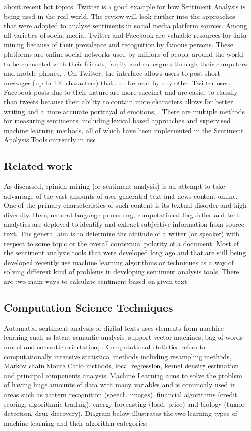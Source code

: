 about recent hot topics. Twitter is a good example for how Sentiment Analysis is being used in the
real world. The review will look further into the approaches that were adopted to analyse
sentiments in social media platform sources. Among all varieties of social media, Twitter and Facebook are valuable resources for data mining
because of their prevalence and recognition by famous persons. These platforms are online social
networks used by millions of people around the world to be connected with their friends, family
and colleagues through their computers and mobile phones, \cite{ref24}.
On Twitter, the interface allows users to post short messages (up to 140 characters) that can
be read by any other Twitter user. Facebook posts due to their nature are more succinct and are
easier to classify than tweets because their ability to contain more characters allows for better
writing and a more accurate portrayal of emotions, \cite{ref25}. There are multiple methods
for measuring sentiments, including lexical based approaches and supervised machine learning
methods, all of which have been implemented in the Sentiment Analysis Tools currently in use

\clearpage
\subsection{Related work}
As discussed, opinion mining (or sentiment analysis) is an attempt to take advantage of the vast
amounts of user-generated text and news content online. One of the primary characteristics of such
content is its textual disorder and high diversity. Here, natural language processing, computational
linguistics and text analytics are deployed to identify and extract subjective information from
source text. The general aim is to determine the attitude of a writer (or speaker) with respect to
some topic or the overall contextual polarity of a document.
Most of the sentiment analysis tools that were developed long ago and that are still being developed
recently use machine learning algorithms or techniques as a way of solving different kind of
problems in developing sentiment analysis tools. There are two main ways to calculate sentiment
based on given text.


\subsection{Computation Science Techniques}
Automated sentiment analysis of digital texts uses elements from machine learning such as latent
semantic analysis, support vector machines, bag-of-words model and semantic orientation,
\cite{ref26}. Computational statistics refers to computationally intensive statistical methods
including resampling methods, Markov chain Monte Carlo methods, local regression, kernel
density estimation and principal components analysis.
Machine Learning aims to solve the problem of having huge amounts of data with many variables
and is commonly used in areas such as pattern recognition (speech, images), financial algorithms
(credit scoring, algorithmic trading)\cite{ref27}, energy forecasting (load, price) and biology
(tumor detection, drug discovery). Diagram below illustrates the two learning types of machine
learning and their algorithm categories:


